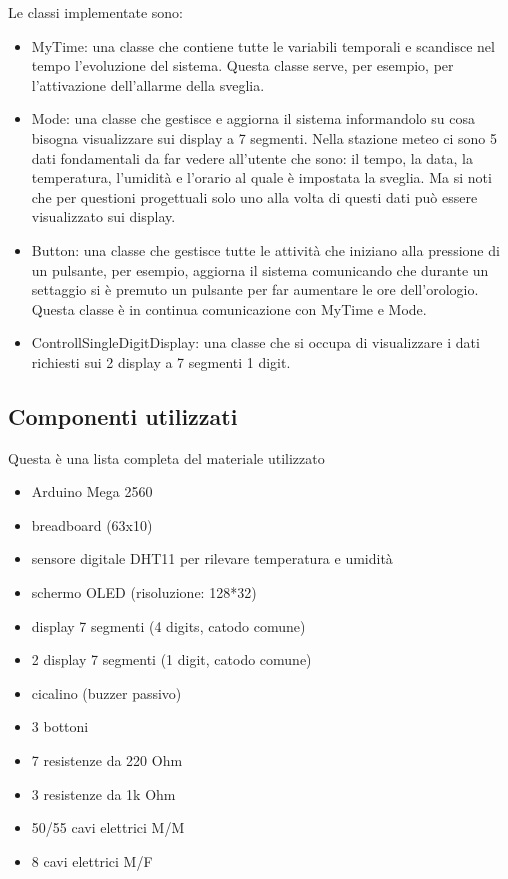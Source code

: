 \documentclass[paper=a4, fontsize=10pt]{scrartcl}
\begin{document}
Le classi implementate sono:

\begin{itemize}
\item MyTime: una classe che contiene tutte le variabili temporali e scandisce nel tempo l'evoluzione del sistema. Questa classe serve, per esempio, per l'attivazione dell'allarme della sveglia.

\item Mode: una classe che gestisce e aggiorna il sistema informandolo su cosa bisogna visualizzare sui display a 7 segmenti. Nella stazione meteo ci sono 5 dati fondamentali da far vedere all'utente che sono: il tempo, la data, la temperatura, l'umidità e l'orario al quale è impostata la sveglia. Ma si noti che per questioni progettuali solo uno alla volta di questi dati può essere visualizzato sui display.

\item Button: una classe che gestisce tutte le attività che iniziano alla pressione di un pulsante, per esempio, aggiorna il sistema comunicando che durante un settaggio si è premuto un pulsante per far aumentare le ore dell'orologio. Questa classe è in continua comunicazione con MyTime e Mode.

\item ControllSingleDigitDisplay: una classe che si occupa di visualizzare i dati richiesti sui 2 display a 7 segmenti 1 digit.
\end{itemize}


\subsection{Componenti utilizzati}
Questa è una lista completa del materiale utilizzato
\begin{itemize}
\item Arduino Mega 2560
\item breadboard (63x10)
\item sensore digitale DHT11 per rilevare temperatura e umidità
\item schermo OLED (risoluzione: 128*32)
\item display 7 segmenti (4 digits, catodo comune)
\item 2 display 7 segmenti (1 digit, catodo comune)
\item cicalino (buzzer passivo)
\item 3 bottoni
\item 7 resistenze da 220 Ohm
\item 3 resistenze da 1k Ohm
\item 50/55 cavi elettrici M/M
\item 8 cavi elettrici M/F
\end{itemize}
\end{document}
